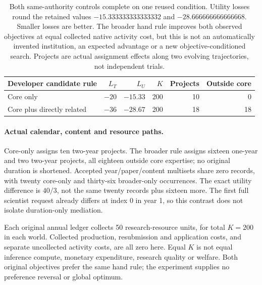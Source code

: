 \begin{table}[t]
\centering\small
\begin{tabular}{lrrrrr}
\toprule
Developer candidate rule & $L_T$ & $L_U$ & $K$ & Projects & Outside core \\
\midrule
Core only & $-20$ & $-15.33$ & 200 & 10 & 0 \\
Core plus directly related & $-36$ & $-28.67$ & 200 & 18 & 18 \\
\bottomrule
\end{tabular}
\caption{Both same-authority controls complete on one reused condition.
Utility losses round the retained values $-15.333333333333332$ and
$-28.666666666666668$. Smaller losses are better. The broader hand rule improves
both observed objectives at equal collected native activity cost, but this is
not an automatically invented institution, an expected advantage or a new
objective-conditioned search. Projects are actual assignment effects along
two evolving trajectories, not independent trials.}
\label{tab:native-topic-same-authority-controls}
\end{table}

\paragraph{Actual calendar, content and resource paths.}
Core-only assigns ten two-year projects. The broader rule assigns sixteen
one-year and two two-year projects, all eighteen outside core expertise; no
original duration is shortened. Accepted year/paper/content multisets share
zero records, with twenty core-only and thirty-six broader-only occurrences.
The exact utility difference is $40/3$, not the same twenty records plus
sixteen more. The first full scientist request already differs at index 0 in
year 1, so this contrast does not isolate duration-only mediation.

Each original annual ledger collects 50 research-resource units, for total
$K=200$ in each world. Collected production, resubmission and application costs,
and separate uncollected activity costs, are all zero here. Equal $K$ is not
equal inference compute, monetary expenditure, research quality or welfare.
Both original objectives prefer the same hand rule; the experiment supplies
no preference reversal or global optimum.

